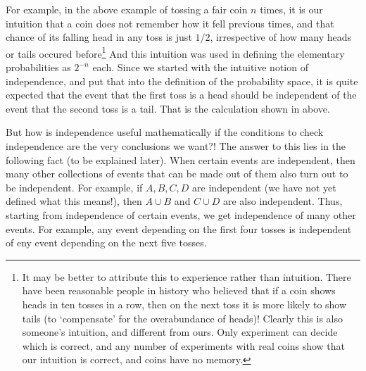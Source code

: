 \documentclass[preprint,  11pt]{amsart}
\theoremstyle{plain} %
\theoremstyle{definition} %
\begin{document}
For example, in the above example of tossing a fair coin $n$ times, it is our intuition that a coin does not remember how it fell previous times, and that chance of its falling head in any toss is just $1/2$, irrespective of how many heads or tails occured before\footnote{It may be better to attribute this to experience rather than intuition. There have been reasonable people in history who believed that if a coin shows heads in ten tosses in a row, then on the next toss it is more likely to show tails (to `compensate' for the overabundance of heads)! Clearly this is also someone's intuition, and different from ours. Only experiment can decide which is correct, and any number of experiments with real coins show that our intuition is correct, and coins have no memory.} And this intuition was used in defining the elementary probabilities as $2^{-n}$ each. Since we started with the intuitive notion of independence, and put that into the definition of the probability space, it is quite expected that the event that the first toss is a head should be independent of the event that the second toss is a tail. That is the calculation shown in above.

But how is independence useful mathematically if the conditions to check independence are the very conclusions we want?! The answer to this lies in the following fact (to be explained later). When certain events are independent, then many other collections of events that can be made out of them also turn out to be independent. For example, if $A,B,C,D$ are independent (we have not yet defined what this means!), then $A\cup B$ and $C\cup D$ are also independent. Thus, starting from independence of certain events, we get independence of many other events. For example, any event depending on the first four tosses is independent of eny event depending on the next five tosses.
\end{document}
